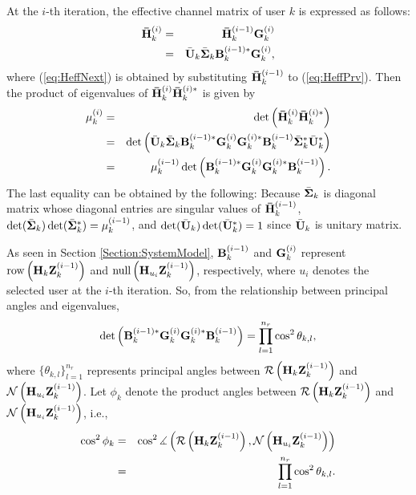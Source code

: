 \documentclass[journal,twoside]{IEEEtranTCOM}
\begin{document}
At the $i$-th iteration, the effective channel matrix of user $k$ is expressed as follows:
\begin{eqnarray}
{{{\bf{\bar H}}}_k^{(i)}} & = & {{{\bf{\bar H}}}_k^{(i-1)}}{\bf{G}}_k^{(i)} \nonumber \\
& = & {\bar{\bf{U}}_k}{\bar{\bf{\Sigma }}_k}{\bf{B}}_k^{(i-1)*}{{\bf{G}}_k^{(i)}} \label{eq:HeffNext},
\end{eqnarray}
where (\ref{eq:HeffNext}) is obtained by substituting ${{\bf{\bar H}}}_k^{(i-1)}$ to (\ref{eq:HeffPrv}). Then the product of eigenvalues of ${{{\bf{\bar H}}}_k^{(i)}}{{{\bf{\bar H}}}_k^{(i)*}}$ is given by
\begin{eqnarray}
\mu _k^{(i)} & = & \det \left({\bf{\bar H}}_k^{(i)}{\bf{\bar H}}_k^{(i)*}\right) \nonumber \\
& = & \det \left({\bar{\bf{U}}_k}{\bar{\bf{\Sigma }}_k}{\bf{B}}_k^{(i-1)*}{{\bf{G}}_k^{(i)}}{{\bf{G}}_k^{(i)*}}{\bf{B}}_k^{(i-1)}{\bar{\bf{\Sigma }}_k^*}\bar{\bf{U}}_k^*\right) \label{eq:Appendixmu1} \nonumber \\
& = & \mu _k^{(i-1)}\det \left({\bf{B}}_k^{(i-1)*}{{\bf{G}}_k^{(i)}}{{\bf{G}}_k^{(i)*}}{\bf{B}}_k^{(i-1)}\right). \label{eq:Appendixmu2}
\end{eqnarray}
The last equality can be obtained by the following: Because ${\bar{\bf{\Sigma }}_k}$ is diagonal matrix whose diagonal entries are singular values of ${{\bf{\bar H}}}_k^{(i-1)}$, $\det({\bar{\bf{\Sigma }}_k})\det({\bar{\bf{\Sigma }}_k}^*)=\mu _k^{(i-1)}$, and $\det(\bar{\bf{U}}_k)\det(\bar{\bf{U}}_k^*)=1$ since $\bar{\bf{U}}_k$ is unitary matrix.

As seen in Section \ref{Section:SystemModel}, ${\bf{B}}_k^{(i-1)}$ and ${\bf{G}}_k^{(i)}$ represent $\mathrm{row}\left({{\bf{H}}_k}{\bf{Z}}_k^{(i-1)}\right)$ and  $\mathrm{null}\left({{\bf{H}}_{u_{i}}}{\bf{Z}}_k^{(i-1)}\right)$, respectively, where ${u_{i}}$ denotes the selected user at the $i$-th iteration. So, from the relationship between principal angles and eigenvalues,
\begin{equation}
\det \left({\bf{B}}_k^{(i-1)*}{{\bf{G}}_k^{(i)}}{{\bf{G}}_k^{(i)*}}{\bf{B}}_k^{(i-1)}\right) = \prod\limits_{l=1}^{{n_r}} {\cos^2 {\theta_{k,l}}},
\end{equation}
where $\{\theta_{k,l}\}_{l=1}^{n_r}$ represents principal angles between ${\cal{R}}\left({{\bf{H}}_k}{\bf{Z}}_k^{(i-1)}\right)$ and ${\cal{N}}\left({{\bf{H}}_{u_{i}}}{\bf{Z}}_k^{(i-1)}\right)$. Let $\phi_k$ denote the product angles between ${\cal{R}}\left({{\bf{H}}_k}{\bf{Z}}_k^{(i-1)}\right)$ and ${\cal{N}}\left({{\bf{H}}_{u_{i}}}{\bf{Z}}_k^{(i-1)}\right)$, i.e.,
\begin{eqnarray} \label{eq:ProdAngle}
\cos ^2 \phi_k & = & \cos ^2 \measuredangle \left({\cal{R}}\left({{\bf{H}}_k}{\bf{Z}}_k^{(i-1)}\right), {\cal{N}}\left({{\bf{H}}_{u_{i}}}{\bf{Z}}_k^{(i-1)}\right)\right) \nonumber \\
& = & \prod\limits_{l=1}^{{n_r}} {\cos ^2 {\theta_{k,l}}}.
\end{eqnarray}
\end{document}
